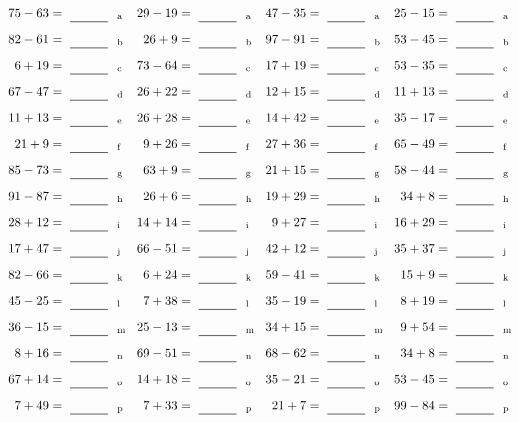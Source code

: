 \documentclass
[
  draft    = true,
  fontsize = 11pt,
  parskip  = half-
]
{scrartcl}
\begin{document}
\clearpage
\begin{align*}
    \pline{75-63}&=\rline{a}
  & \pline{29-19}&=\rline{a}
  & \pline{47-35}&=\rline{a}
  & \pline{25-15}&=\rline{a} \\[1ex]
    \pline{82-61}&=\rline{b}
  & \pline{26+9}&=\rline{b}
  & \pline{97-91}&=\rline{b}
  & \pline{53-45}&=\rline{b} \\[1ex]
    \pline{6+19}&=\rline{c}
  & \pline{73-64}&=\rline{c}
  & \pline{17+19}&=\rline{c}
  & \pline{53-35}&=\rline{c} \\[1ex]
    \pline{67-47}&=\rline{d}
  & \pline{26+22}&=\rline{d}
  & \pline{12+15}&=\rline{d}
  & \pline{11+13}&=\rline{d} \\[1ex]
    \pline{11+13}&=\rline{e}
  & \pline{26+28}&=\rline{e}
  & \pline{14+42}&=\rline{e}
  & \pline{35-17}&=\rline{e} \\[1ex]
    \pline{21+9}&=\rline{f}
  & \pline{9+26}&=\rline{f}
  & \pline{27+36}&=\rline{f}
  & \pline{65-49}&=\rline{f} \\[1ex]
    \pline{85-73}&=\rline{g}
  & \pline{63+9}&=\rline{g}
  & \pline{21+15}&=\rline{g}
  & \pline{58-44}&=\rline{g} \\[1ex]
    \pline{91-87}&=\rline{h}
  & \pline{26+6}&=\rline{h}
  & \pline{19+29}&=\rline{h}
  & \pline{34+8}&=\rline{h} \\[1ex]
    \pline{28+12}&=\rline{i}
  & \pline{14+14}&=\rline{i}
  & \pline{9+27}&=\rline{i}
  & \pline{16+29}&=\rline{i} \\[1ex]
    \pline{17+47}&=\rline{j}
  & \pline{66-51}&=\rline{j}
  & \pline{42+12}&=\rline{j}
  & \pline{35+37}&=\rline{j} \\[1ex]
    \pline{82-66}&=\rline{k}
  & \pline{6+24}&=\rline{k}
  & \pline{59-41}&=\rline{k}
  & \pline{15+9}&=\rline{k} \\[1ex]
    \pline{45-25}&=\rline{l}
  & \pline{7+38}&=\rline{l}
  & \pline{35-19}&=\rline{l}
  & \pline{8+19}&=\rline{l} \\[1ex]
    \pline{36-15}&=\rline{m}
  & \pline{25-13}&=\rline{m}
  & \pline{34+15}&=\rline{m}
  & \pline{9+54}&=\rline{m} \\[1ex]
    \pline{8+16}&=\rline{n}
  & \pline{69-51}&=\rline{n}
  & \pline{68-62}&=\rline{n}
  & \pline{34+8}&=\rline{n} \\[1ex]
    \pline{67+14}&=\rline{o}
  & \pline{14+18}&=\rline{o}
  & \pline{35-21}&=\rline{o}
  & \pline{53-45}&=\rline{o} \\[1ex]
    \pline{7+49}&=\rline{p}
  & \pline{7+33}&=\rline{p}
  & \pline{21+7}&=\rline{p}
  & \pline{99-84}&=\rline{p}
\end{align*}
\end{document}
